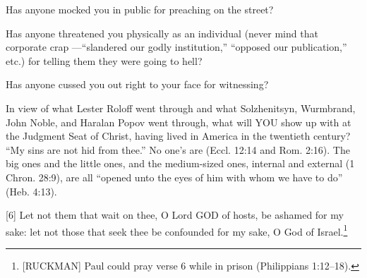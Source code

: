 {\begin{compactenum}
\item Has anyone mocked you in public for preaching on the street?
\item Has anyone threatened you physically as an individual (never mind that corporate crap  —“slandered our godly institution,” “opposed our publication,” etc.) for telling them they were going to hell?
\item Has anyone cussed you out right to your face for witnessing?
\end{compactenum}
In view of what Lester Roloff went through and what Solzhenitsyn, Wurmbrand, John Noble, and Haralan Popov went through, what will YOU show up with at the Judgment Seat of Christ, having lived in America in the twentieth century? “My sins are not hid from thee.” No one’s are (Eccl. 12:14 and Rom. 2:16). The big ones and the little ones, and the medium-sized ones, internal and external (1 Chron. 28:9), are all “opened unto the eyes of him with whom we have to do” (Heb. 4:13).}
[6] \textcolor[rgb]{0.00,0.00,1.00}{Let not them that wait on thee, O Lord GOD of hosts, be ashamed for my sake: let not those that seek thee be confounded for my sake, O God of Israel.}\footnote{[RUCKMAN] Paul could pray verse 6 while in prison (Philippians 1:12--18).\cite{Ruckman1992Psalms} }
